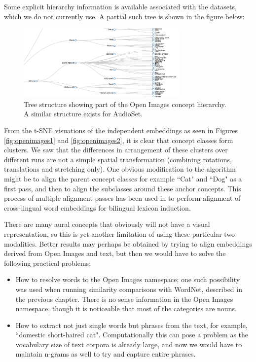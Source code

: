 Some explicit hierarchy information is available associated with the datasets, which we do not currently use. A partial such tree is shown in the figure below:

\begin{figure}[H]
\label{fig:tree}
    \centering
    \includegraphics[width=0.75\textwidth]{images/conclusions/tree.png}
    \caption{
        Tree structure showing part of the Open Images concept hierarchy. A similar structure exists for AudioSet.
    }
\end{figure}

From the t-SNE visuations of the independent embeddings as seen in Figures \ref{fig:openimages1} and \ref{fig:openimages2}, it is clear that concept classes form clusters. We saw that the differences in arrangement of these clusters over different runs are not a simple spatial transformation (combining rotations, translations and stretching only). One obvious modification to the algorithm might be to align the parent concept classes for example ``Cat" and ``Dog" as a first pass, and then to align the subclasses around these anchor concepts. This process of multiple alignment passes has been used in \cite{UnsupervisedAlignmentWP} to perform alignment of cross-lingual word embeddings for bilingual lexicon induction. 

There are many aural concepts that obviously will not have a visual representation, so this is yet another limitation of using these particular two modalities. Better results may perhaps be obtained by trying to align embeddings derived from Open Images and text, but then we would have to solve the following practical problems:

\begin{itemize}
    \item How to resolve words to the Open Images namespace; one such possibility was used when running similarity comparisons with WordNet, described in the previous chapter. There is no sense information in the Open Images namespace, though it is noticeable that most of the categories are nouns.  
    \item How to extract not just single words but phrases from the text, for example, ``domestic short-haired cat". Computationally this can pose a problem as the vocabulary size of text corpora is already large, and now we would have to maintain n-grams as well to try and capture entire phrases. 
\end{itemize}


